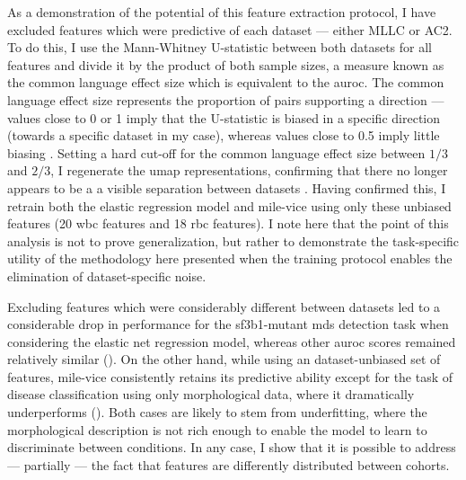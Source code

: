 As a demonstration of the potential of this feature extraction protocol, I have excluded features which were predictive of each dataset --- either MLLC or AC2. To do this, I use the Mann-Whitney U-statistic between both datasets for all features and divide it by the product of both sample sizes, a measure known as the common language effect size which is equivalent to the \ac{auroc}. The common language effect size represents the proportion of pairs supporting a direction --- values close to 0 or 1 imply that the U-statistic is biased in a specific direction (towards a specific dataset in my case), whereas values close to 0.5 imply little biasing \cite{Kerby2014-fy}. Setting a hard cut-off for the common language effect size between $1/3$ and $2/3$, I regenerate the \ac{umap} representations, confirming that there no longer appears to be a a visible separation between datasets . Having confirmed this, I retrain both the elastic regression model and \ac{mile-vice} using only these unbiased features (20 \ac{wbc} features and 18 \ac{rbc} features). I note here that the point of this analysis is not to prove generalization, but rather to demonstrate the task-specific utility of the methodology here presented when the training protocol enables the elimination of dataset-specific noise.

\begin{figure}[!ht]
    \label{fig:u-map-unbiased}
\end{figure}

Excluding features which were considerably different between datasets led to a considerable drop in performance for the \ac{sf3b1}-mutant \ac{mds} detection task when considering the elastic net regression model, whereas other \ac{auroc} scores remained relatively similar (). On the other hand, while using an dataset-unbiased set of features, \ac{mile-vice} consistently retains its predictive ability except for the task of disease classification using only morphological data, where it dramatically underperforms (). Both cases are likely to stem from underfitting, where the morphological description is not rich enough to enable the model to learn to discriminate between conditions. In any case, I show that it is possible to address --- partially --- the fact that features are differently distributed between cohorts.

